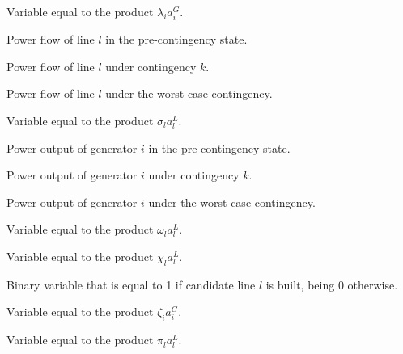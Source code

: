 \begin{description}
\item[${e}_{i}$] Variable equal to the product ${{\lambda}_{i}} {a}^{G}_{i}$.

\item[${f}_{l}$] Power flow of line $l$ in the pre-contingency state.

\item[${f}^{k}_{l}$] Power flow of line $l$ under contingency $k$.

\item[${f}^{wc}_{l}$] Power flow of line $l$ under the worst-case contingency.

\item[${h}_{l}$] Variable equal to the product ${{\sigma}_{l}} {a}^{L}_{l}$.

\item[${p}_{i}$] Power output of generator $i$ in the pre-contingency state.

\item[${p}^{k}_{i}$] Power output of generator $i$ under contingency ${k}$.

\item[${p}^{wc}_{i}$] Power output of generator $i$ under the worst-case contingency.

\item[${q}_{l}$] Variable equal to the product ${{\omega}_{l}} {a}^{L}_{l}$.

\item[${r}_{l}$] Variable equal to the product ${{\chi}_{l}} {a}^{L}_{l}$.

\item[${v}_{l}$] Binary variable that is equal to 1 if candidate line $l$ is built, being 0 otherwise.

\item[${y}_{i}$] Variable equal to the product ${{\zeta}_{i}} {a}^{G}_{i}$.

\item[${z}_{l}$] Variable equal to the product ${{\pi}_{l}} {a}^{L}_{l}$.

\end{description}


